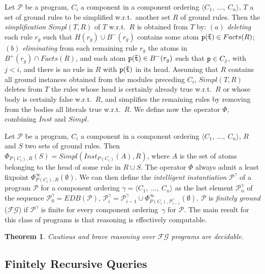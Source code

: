 \documentclass{tlp}
\newcommand{\p}{\ensuremath{{\mathcal{P}}}}
\newcommand{\intelligent}{\ensuremath{\p}}
\newcommand{\R}{\ensuremath{r}}
\newcommand{\head}[1]{\ensuremath{H(#1)}}
\newcommand{\posbody}[1]{\ensuremath{B^+(#1)}}
\newcommand{\negbody}[1]{\ensuremath{B^-(#1)}}
\newtheorem{theorem}{Theorem}[section]
\renewcommand{\t}{\bar t}
\newcommand{\EDB}{\ensuremath{E\!D\!B}\xspace}
\newcommand{\Facts}{\ensuremath{Facts}}
\newcommand{\fg}{$\mathcal{FG}$\xspace}
\begin{document}
Let $\p$ be a program, $C_i$ a component in a component ordering 
$\langle C_1,\ \ldots,\ C_n \rangle$, $T$ a set of ground rules to be 
simplified w.r.t.\ another set $R$ of ground rules.
Then the {\em simplification} $Simpl(T,R)$ of $T$ w.r.t.\ $R$ is obtained
from $T$ by: $(a)$ {\em deleting} each rule $\R_g$ such that 
$\head{\R_g} \cup \negbody{\R_g}$ contains some atom ${\tt p(\t)} \in \Facts(R)$; 
$(b)$ {\em eliminating}
from each remaining rule $\R_g$ the atoms in $\posbody{\R_g} \cap \Facts(R)$, 
and each atom ${\tt p(\t)} \in \negbody{\R_g}$ 
such that ${\tt p} \in C_j$, with $j < i$, and there is no rule in $R$ with
$\tt p(\t)$ in its head.
Assuming that $R$ contains all ground instances obtained from
the modules preceding $C_i$, $Simpl(T,R)$ deletes from $T$
the rules whose head is certainly already true w.r.t.\ $R$
or whose body is certainly false w.r.t.\ $R$, and
simplifies the remaining rules by removing from the bodies all
literals true w.r.t.\ $R$. We define now the operator $\Phi$,
combining $Inst$ and $Simpl$.



Let $\p$ be a program, $C_i$ a component in
a component ordering $\langle C_1,\ \ldots,\ C_n \rangle$, 
$R$ and $S$ two sets of ground rules.
Then $\Phi_{P(C_i),R}(S)= Simpl(Inst_{P(C_i)}(A), R)$,
where $A$ is the set of atoms belonging to the head of some rule in 
$R \cup S$.
The operator $\Phi$ always admit a least fixpoint 
$\Phi_{P(C_i),R}^\infty(\emptyset)$.
We can then define the {\em intelligent instantiation} $\p^\gamma$ of a program $\p$ 
for a component ordering $\gamma = \langle C_1,\ \ldots,\ C_n \rangle$ 
as the last element $\intelligent_n^\gamma$ of the sequence $\intelligent_0^\gamma = \EDB(\p)$,
$\intelligent_{i}^\gamma = \intelligent_{i-1}^\gamma \cup \Phi^\infty_{P(C_{i}),\intelligent_{i-1}^\gamma}(\emptyset)$. 
$\p$ is {\em finitely ground} (\fg)
if $\p^\gamma$ is finite for every component ordering~$\gamma$ for $\p$.
The main result for this class of programs is that reasoning is effectively computable.

\begin{theorem}\label{theo:fg-reasoningDecidable}
Cautious and brave
reasoning over \fg programs are decidable.
\end{theorem}

\subsection{Finitely Recursive Queries}\label{sec:magic_fr_queries}
\end{document}

